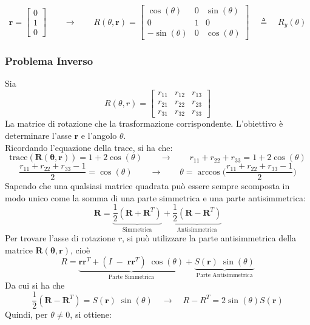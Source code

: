 \documentclass[11pt, a4paper]{report}
\begin{document}
\[
\mathbf{r} =
\begin{bmatrix}
0 \\
1 \\
0
\end{bmatrix}
\qquad\longrightarrow\qquad
R(\theta, \mathbf{r}) =
\begin{bmatrix}
    \cos(\theta) & 0 & \sin(\theta) \\
    0 & 1 & 0 \\
    -\sin(\theta) & 0 & \cos(\theta)
\end{bmatrix}
\quad \triangleq \quad R_y(\theta)
\]

\newpage
\subsubsection{Problema Inverso}
Sia
\[
    R(\theta, r) =
    \begin{bmatrix}
        r_{11} & r_{12} & r_{13} \\
        r_{21} & r_{22} & r_{23} \\
        r_{31} & r_{32} & r_{33}
    \end{bmatrix}
\]
La matrice di rotazione che la trasformazione corrispondente. L'obiettivo è determinare l'asse $\mathbf{r}$ e l'angolo $\theta$.\\
Ricordando l'equazione della \(\text{trace}\), si ha che:
\[
    \text{trace}(\mathbf{\mathbf{R}(\theta, \mathbf{r})}) = 1 + 2\cos(\theta)
    \qquad\longrightarrow\qquad
    r_{11} + r_{22} + r_{33} = 1 + 2\cos(\theta)
\]
\[
    \frac{r_{11} + r_{22} + r_{33} - 1}{2} = \cos(\theta)
    \qquad\longrightarrow\qquad
    \theta = \arccos\biggl( \frac{r_{11} + r_{22} + r_{33} - 1}{2} \biggr)
\]
Sapendo che una qualsiasi matrice quadrata può essere sempre scomposta in modo unico come la somma di una parte simmetrica e una parte antisimmetrica:
\[
    \mathbf{R} = \underbrace{\frac{1}{2}(\mathbf{R} + \mathbf{R}^T)}_{\text{Simmetrica}} + \underbrace{\frac{1}{2}(\mathbf{R} - \mathbf{R}^T)}_{\text{Antisimmetrica}}
\]
Per trovare l'asse di rotazione \( r \), si può utilizzare la parte antisimmetrica della matrice \( \mathbf{\mathbf{R}(\theta, \mathbf{r})} \), cioè
\[
    R = \underbrace{\mathbf{r}\mathbf{r}^{T} + (I \; - \; \mathbf{r}\mathbf{r}^{T}) \; \cos(\theta)}_{\text{Parte Simmetrica}} + \underbrace{ S(\mathbf{r}) \; \sin(\theta)}_{\text{Parte Antisimmetrica}}
\]
Da cui si ha che
\[
    \frac{1}{2}(\mathbf{R} - \mathbf{R}^T) = S(\mathbf{r}) \; \sin(\theta) \quad \longrightarrow \quad R - R^{T} = 2 \sin(\theta) S(\mathbf{r})
\]
Quindi, per $\theta \ne 0$, si ottiene:
\end{document}
